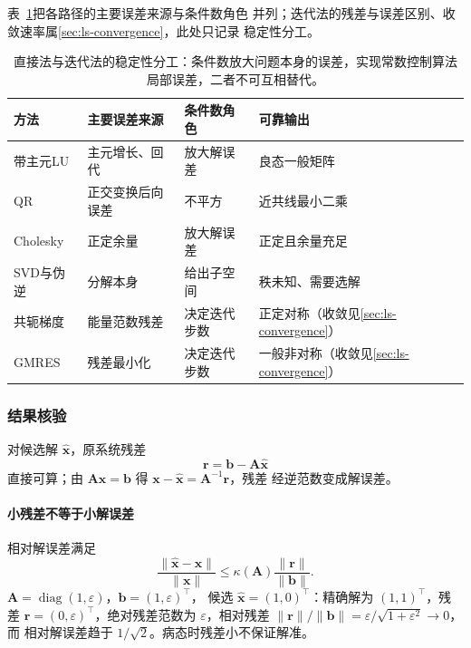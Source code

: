 表~\ref{tab:matrix-analysis-solver-conditions}把各路径的主要误差来源与条件数角色
并列；迭代法的残差与误差区别、收敛速率属\ref{sec:ls-convergence}，此处只记录
稳定性分工。

\begin{table}
\centering
\small
\setlength{\tabcolsep}{5pt}
\caption{直接法与迭代法的稳定性分工：条件数放大问题本身的误差，实现常数控制算法
局部误差，二者不可互相替代。}
\label{tab:matrix-analysis-solver-conditions}
\begin{tabular}{llll}
方法 & 主要误差来源 & 条件数角色 & 可靠输出 \\
\hline
带主元LU & 主元增长、回代 & 放大解误差 & 良态一般矩阵 \\
QR & 正交变换后向误差 & 不平方 & 近共线最小二乘 \\
Cholesky & 正定余量 & 放大解误差 & 正定且余量充足 \\
SVD与伪逆 & 分解本身 & 给出子空间 & 秩未知、需要选解 \\
共轭梯度 & 能量范数残差 & 决定迭代步数 & 正定对称（收敛见\ref{sec:ls-convergence}） \\
GMRES & 残差最小化 & 决定迭代步数 & 一般非对称（收敛见\ref{sec:ls-convergence}） \\
\end{tabular}
\end{table}

\subsubsection{结果核验}
\label{sec:ls-result-verification}
\label{sec:matrix-analysis-error-verification}

对候选解 $\widehat{\bm x}$，原系统残差
\begin{equation}
 \bm r=\bm b-\bm A\widehat{\bm x}
 \label{eq:matrix-analysis-residual}
\end{equation}
直接可算；由 $\bm A\bm x=\bm b$ 得 $\bm x-\widehat{\bm x}=\bm A^{-1}\bm r$，残差
经逆范数变成解误差。

\paragraph{小残差不等于小解误差}

相对解误差满足
\[
 \frac{\lVert\widehat{\bm x}-\bm x\rVert}{\lVert\bm x\rVert}
 \leq\kappa(\bm A)\frac{\lVert\bm r\rVert}{\lVert\bm b\rVert}.
\]
$\bm A=\operatorname{diag}(1,\varepsilon)$，$\bm b=(1,\varepsilon)^\top$，
候选 $\widehat{\bm x}=(1,0)^\top$：精确解为 $(1,1)^\top$，残差
$\bm r=(0,\varepsilon)^\top$，绝对残差范数为 $\varepsilon$，相对残差
$\lVert\bm r\rVert/\lVert\bm b\rVert=\varepsilon/\sqrt{1+\varepsilon^2}\to0$，而
相对解误差趋于 $1/\sqrt2$。病态时残差小不保证解准。

